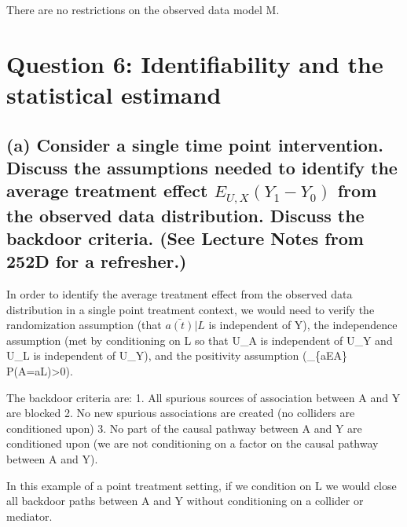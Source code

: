 \documentclass[]{article}
\begin{document}
There are no restrictions on the observed data model M.

\section{Question 6: Identifiability and the statistical
estimand}\label{question-6-identifiability-and-the-statistical-estimand}

\subsection{\texorpdfstring{(a) Consider a single time point
intervention. Discuss the assumptions needed to identify the average
treatment effect \(E_{U,X}(Y_1 -Y_0)\) from the observed data
distribution. Discuss the backdoor criteria. (See Lecture Notes from
252D for a
refresher.)}{(a) Consider a single time point intervention. Discuss the assumptions needed to identify the average treatment effect E\_\{U,X\}(Y\_1 -Y\_0) from the observed data distribution. Discuss the backdoor criteria. (See Lecture Notes from 252D for a refresher.)}}\label{a-consider-a-single-time-point-intervention.-discuss-the-assumptions-needed-to-identify-the-average-treatment-effect-e_uxy_1--y_0-from-the-observed-data-distribution.-discuss-the-backdoor-criteria.-see-lecture-notes-from-252d-for-a-refresher.}

In order to identify the average treatment effect from the observed data
distribution in a single point treatment context, we would need to
verify the randomization assumption (that \(\bar{a(t)}|L\) is
independent of Y), the independence assumption (met by conditioning on L
so that U\_A is independent of U\_Y and U\_L is independent of U\_Y),
and the positivity assumption (\min\_\{aEA\}
P(A=a\textbar{}L)\textgreater{}0).

The backdoor criteria are: 1. All spurious sources of association
between A and Y are blocked 2. No new spurious associations are created
(no colliders are conditioned upon) 3. No part of the causal pathway
between A and Y are conditioned upon (we are not conditioning on a
factor on the causal pathway between A and Y).

In this example of a point treatment setting, if we condition on L we
would close all backdoor paths between A and Y without conditioning on a
collider or mediator.
\end{document}
